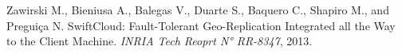 \begin{thebibliography}{99}
{
Zawirski M., Bieniusa A., Balegas V., Duarte S., Baquero C., Shapiro M., and Pregui{\c c}a N.
SwiftCloud: Fault-Tolerant Geo-Replication Integrated all the Way to the Client Machine.
{\it INRIA Tech Reoprt N° RR-8347}, 2013.
















































































































}
\end{thebibliography}
